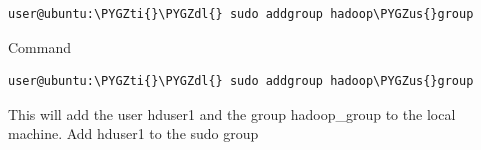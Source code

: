 \documentclass[a4paper,12pt,oneside]{sphinxmanual}
\def\PYGZus{\char`\_}
\def\PYGZdl{\char`\$}
\def\PYGZti{\char`\~}
\begin{document}
\begin{Verbatim}[commandchars=\\\{\}]
user@ubuntu:\PYGZti{}\PYGZdl{} sudo addgroup hadoop\PYGZus{}group
\end{Verbatim}
\begin{figure}[htbp]
\centering

\end{figure}

Command

\begin{Verbatim}[commandchars=\\\{\}]
user@ubuntu:\PYGZti{}\PYGZdl{} sudo addgroup hadoop\PYGZus{}group
\end{Verbatim}
\begin{figure}[htbp]
\centering

\end{figure}

This will add the user hduser1 and the group hadoop\_group to the local machine.
Add hduser1 to the sudo group
\end{document}
